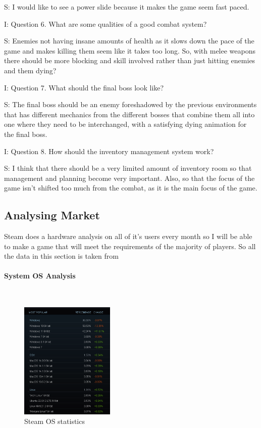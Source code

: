 \documentclass{article}
\newcommand{\parBr}{\vspace{5mm}}%
\newcommand{\myparagraph}[1]{\paragraph{#1}\mbox{}\\} %
\begin{document}
\parBr

S: I would like to see a power slide because it makes the game seem fast paced. 

\parBr

I: Question 6. What are some qualities of a good combat system? 

\parBr

S: Enemies not having insane amounts of health as it slows down the pace of the game and makes killing them seem like it takes too long. So, with melee weapons there should be more blocking and skill involved rather than just hitting enemies and them dying? 

\parBr

I: Question 7. What should the final boss look like? 

\parBr

S: The final boss should be an enemy foreshadowed by the previous environments that has different mechanics from the different bosses that combine them all into one where they need to be interchanged, with a satisfying dying animation for the final boss.  

\parBr

I: Question 8. How should the inventory management system work? 

\parBr

S: I think that there should be a very limited amount of inventory room so that management and planning become very important. Also, so that the focus of the game isn't shifted too much from the combat, as it is the main focus of the game. 

\subsection{Analysing Market}
Steam does a hardware analysis on all of it's users every month so I will be able to make a game that will meet the requirements of the majority of players. So all the data in this section is taken from \cite{SHS}

\myparagraph{System OS Analysis}

\begin{figure}[h]
\centering
\includegraphics[width = 0.4\textwidth]{steamOSsurvey}
\caption{\cite{SHS} Steam OS statistics}
\label{steam OS statistics}
\end{figure}
\end{document}
